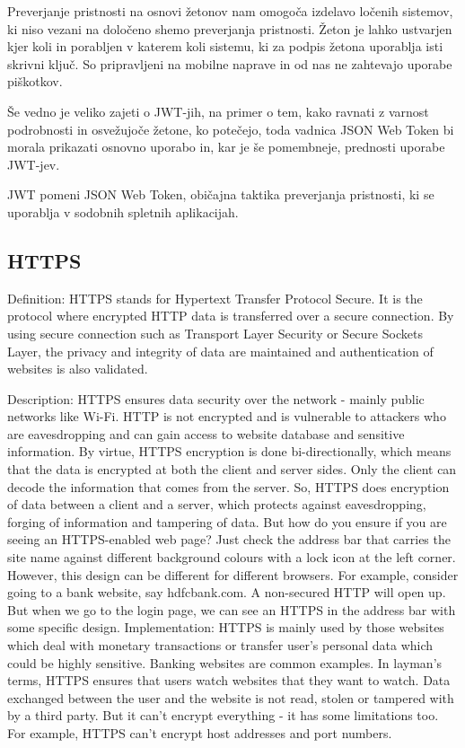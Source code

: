 \documentclass[a4paper, 12pt]{book}
\begin{document}
Preverjanje pristnosti na osnovi žetonov nam omogoča izdelavo ločenih sistemov, ki niso vezani na določeno shemo preverjanja pristnosti. Žeton je lahko ustvarjen kjer koli in porabljen v katerem koli sistemu, ki za podpis žetona uporablja isti skrivni ključ. So pripravljeni na mobilne naprave in od nas ne zahtevajo uporabe piškotkov.

Še vedno je veliko zajeti o JWT-jih, na primer o tem, kako ravnati z varnost podrobnosti in osvežujoče žetone, ko potečejo, toda vadnica JSON Web Token bi morala prikazati osnovno uporabo in, kar je še pomembneje, prednosti uporabe JWT-jev.

JWT pomeni JSON Web Token, običajna taktika preverjanja pristnosti, ki se uporablja v sodobnih spletnih aplikacijah.

\subsection{HTTPS}
Definition: HTTPS stands for Hypertext Transfer Protocol Secure. It is the protocol where encrypted HTTP data is transferred over a secure connection. By using secure connection such as Transport Layer Security or Secure Sockets Layer, the privacy and integrity of data are maintained and authentication of websites is also validated.

Description: HTTPS ensures data security over the network - mainly public networks like Wi-Fi. HTTP is not encrypted and is vulnerable to attackers who are eavesdropping and can gain access to website database and sensitive information. By virtue, HTTPS encryption is done bi-directionally, which means that the data is encrypted at both the client and server sides. Only the client can decode the information that comes from the server. So, HTTPS does encryption of data between a client and a server, which protects against eavesdropping, forging of information and tampering of data. But how do you ensure if you are seeing an HTTPS-enabled web page? Just check the address bar that carries the site name against different background colours with a lock icon at the left corner. However, this design can be different for different browsers. For example, consider going to a bank website, say hdfcbank.com. A non-secured HTTP will open up. But when we go to the login page, we can see an HTTPS in the address bar with some specific design. Implementation: HTTPS is mainly used by those websites which deal with monetary transactions or transfer user's personal data which could be highly sensitive. Banking websites are common examples. In layman's terms, HTTPS ensures that users watch websites that they want to watch. Data exchanged between the user and the website is not read, stolen or tampered with by a third party. But it can't encrypt everything - it has some limitations too. For example, HTTPS can't encrypt host addresses and port numbers.
\end{document}
